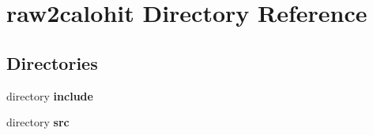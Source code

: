 \section{raw2calohit Directory Reference}
\label{dir_27388c1674127e321e96251325cc79e9}
\subsection*{Directories}
\begin{DoxyCompactItemize}
\item 
directory {\bf include}
\item 
directory {\bf src}
\end{DoxyCompactItemize}
